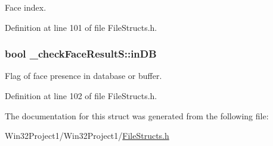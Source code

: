 Face index. 



Definition at line 101 of file File\+Structs.\+h.

\subsubsection[{\texorpdfstring{in\+DB}{inDB}}]{\setlength{\rightskip}{0pt plus 5cm}bool \+\_\+check\+Face\+Result\+S\+::in\+DB}\hypertarget{struct__check_face_result_s_aa7353d6109af6ce0a9b2c8c07e09a48b}{}\label{struct__check_face_result_s_aa7353d6109af6ce0a9b2c8c07e09a48b}


Flag of face presence in database or buffer. 



Definition at line 102 of file File\+Structs.\+h.



The documentation for this struct was generated from the following file\+:\begin{DoxyCompactItemize}
\item 
Win32\+Project1/\+Win32\+Project1/\hyperlink{_file_structs_8h}{File\+Structs.\+h}\end{DoxyCompactItemize}
